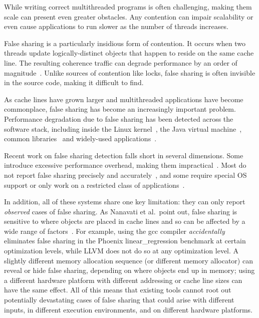 \label{sec:intro} 

While writing correct multithreaded programs is often challenging,
making them scale can present even greater obstacles. Any contention can impair scalability or even cause
applications to run slower as the number of threads increases.

False sharing is a particularly insidious form of contention.
It occurs when two threads update logically-distinct objects that happen to reside on the same cache line. The resulting
coherence traffic can degrade performance by an order of
magnitude~\cite{falseshareeffect}. Unlike sources of contention like locks, false sharing is often invisible in the source code, making it difficult to find.

As cache lines have grown larger and multithreaded applications have
become commonplace, false sharing has become an increasingly important
problem. Performance degradation due to false sharing has been detected across the software stack,
including inside the Linux kernel~\cite{OSfalsesharing}, the Java
virtual machine~\cite{JVMfalsesharing}, common
libraries~\cite{libfalsesharing} and widely-used
applications~\cite{mysql,appfalsesharing}.

Recent work on false sharing detection falls short in several dimensions. Some introduce excessive performance overhead, making them impractical~\cite{falseshare:binaryinstrumentation1,falseshare:binaryinstrumentation2,falseshare:simulator}. Most do not report false sharing precisely and accurately~\cite{falseshare:binaryinstrumentation1,detect:ptu,detect:intel,falseshare:binaryinstrumentation2,DProf,qinzhaodetection}, and some require special OS support or only work on a restricted class of applications~\cite{OSdetection,sheriff}.

In addition, all of these systems share one key limitation: they can
only report \emph{observed} cases of false sharing. As Nanavati et al.\ point out, false sharing is sensitive to where objects are placed in cache lines and so can be affected by a wide range of factors~\cite{OSdetection}. For example, using the gcc compiler \emph{accidentally} eliminates false sharing in the Phoenix linear\_regression benchmark at certain optimization levels, while LLVM does not do so at any optimization level.  A slightly different memory allocation sequence (or different memory allocator) can reveal or hide
false sharing, depending on where objects end up in memory; using a different hardware platform with different addressing or cache line sizes can have the same effect. All of this means that existing tools cannot root out potentially devastating cases of false sharing that could arise with different inputs, in different execution environments, and on different hardware platforms.

